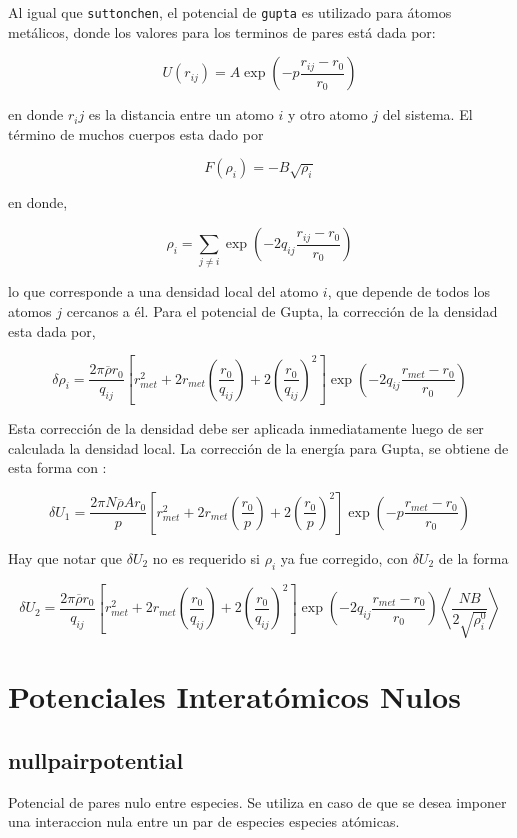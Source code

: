 Al igual que \verb|suttonchen|, el potencial de \verb|gupta| es utilizado para \'atomos met\'alicos, donde los valores para los terminos de pares est\'a dada por:

$$U(r_{ij}) = A\exp{\left(-p\frac{r_{ij}-r_0}{r_0}\right)}$$

en donde $r_ij$ es la distancia entre un atomo $i$ y otro atomo $j$ del sistema. El t\'ermino de muchos cuerpos esta dado por

$$F(\rho_{i}) = -B\sqrt{\rho_i}$$

en donde,

$$\rho_i = \sum_{j\neq i} \exp{\left(-2q_{ij}\frac{r_{ij}-r_0}{r_0}\right)}$$

lo que corresponde a una densidad local del atomo $i$, que depende de todos los atomos $j$ cercanos a \'el. Para el potencial de Gupta, la correcci\'on de la densidad esta dada por,

$$\delta\rho_i=\frac{2\pi\overline{\rho}r_0}{q_{ij}}\left[r^2_{met}+2r_{met}\left(\frac{r_0}{q_{ij}}\right)+2\left(\frac{r_0}{q_{ij}}\right)^2\right]\exp{\left(-2q_{ij}\frac{r_{met}-r_0}{r_0}\right)}$$

Esta correcci\'on de la densidad debe ser aplicada inmediatamente luego de ser calculada la densidad local. La correcci\'on de la energ\'ia para Gupta, se obtiene de esta forma con :

$$\delta U_1 = \frac{2\pi N\overline{\rho}A r_0}{p}\left[r^2_{met}+2r_{met}\left(\frac{r_0}{p}\right)+2\left(\frac{r_0}{p}\right)^2\right]\exp{\left(-p\frac{r_{met}-r_0}{r_0}\right)}$$

Hay que notar que $\delta U_2$ no es requerido si $\rho_i$ ya fue corregido, con $\delta U_2$ de la forma

$$\delta U_2 = \frac{2\pi\overline{\rho} r_0}{q_{ij}}\left[r^2_{met}+2r_{met}\left(\frac{r_0}{q_{ij}}\right)+2\left(\frac{r_0}{q_{ij}}\right)^2\right]\exp{\left(-2q_{ij}\frac{r_{met}-r_0}{r_0}\right)}\left<\frac{NB}{2\sqrt{\rho_i^0}}\right>$$


\section{Potenciales Interat\'omicos Nulos}
\subsection{nullpairpotential}
Potencial de pares nulo entre especies. Se utiliza en caso de que se desea imponer una interaccion nula entre un par de especies especies at\'omicas. 

